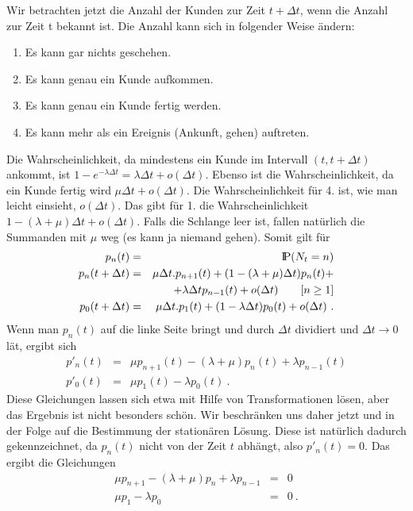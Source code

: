 Wir betrachten jetzt die Anzahl der Kunden zur Zeit $t+ \Delta t$, wenn
die Anzahl zur Zeit t bekannt ist. Die Anzahl kann sich in folgender Weise
ändern:
\begin{enumerate}
\item Es kann gar nichts geschehen.
\item Es kann genau ein Kunde aufkommen.
\item Es kann genau ein Kunde fertig werden.
\item Es kann mehr als ein Ereignis (Ankunft, gehen) auftreten.
\end{enumerate}
Die Wahrscheinlichkeit, da\3 mindestens ein Kunde im Intervall $(t, t+ \Delta t)$
ankommt, ist $1-e^{-\lambda \Delta t} = \lambda \Delta t + o (\Delta t)$.
Ebenso ist die Wahrscheinlichkeit, da\3 ein Kunde fertig wird $\mu \Delta
t + o(\Delta t)$. Die Wahrscheinlichkeit für 4. ist, wie man leicht
einsieht, $o(\Delta t)$. Das gibt für 1. die Wahrscheinlichkeit $1 -
(\lambda + \mu) \Delta t + o(\Delta t)$. Falls die Schlange leer ist,
fallen natürlich die Summanden mit $\mu$ weg (es kann ja niemand gehen).
Somit gilt für
\begin{eqnarray*}
p_{n}(t) &=& {\rm I\kern-0.2em P} (N_{t} = n) \\
p_{n}(t+ \Delta t) &=& \mu \Delta t . p_{n+1}(t) + (1 - (\lambda +
\mu) \Delta t) p_{n}(t) + \\
 & &+ \lambda \Delta t p_{n-1}(t) + o(\Delta t)
\qquad [n \geq 1] \\
p_{0}(t + \Delta t) &=& \mu \Delta t . p_{1}(t) + (1 - \lambda \Delta t)
p_{0}(t) + o(\Delta t) ~.
\end{eqnarray*}
Wenn man $p_{n}(t)$ auf die linke Seite bringt und durch $\Delta t$
dividiert und $\Delta t \rightarrow 0$ lä\3t, ergibt sich
\begin{eqnarray*}
p'_{n}(t) &=& \mu p_{n+1}(t)-(\lambda + \mu) p_{n}(t)+ \lambda p_{n-1}(t)
\\
p'_{0}(t) &=& \mu p_{1}(t)- \lambda p_{0}(t) ~.
\end{eqnarray*}
Diese Gleichungen lassen sich etwa mit Hilfe von Transformationen lösen,
aber das Ergebnis ist nicht besonders schön. Wir beschränken uns daher
jetzt und in der Folge auf die Bestimmung der stationären Lösung. Diese
ist natürlich dadurch gekennzeichnet, da\3 $p_{n}(t)$ nicht von der Zeit
$t$ abhängt, also $p'_{n}(t)=0$. Das ergibt die Gleichungen
\begin{eqnarray*}
\mu p_{n+1}-(\lambda +\mu) p_{n} + \lambda p_{n-1} &=& 0 \\
\mu p_{1} - \lambda p_{0} &=& 0 ~.
\end{eqnarray*}

